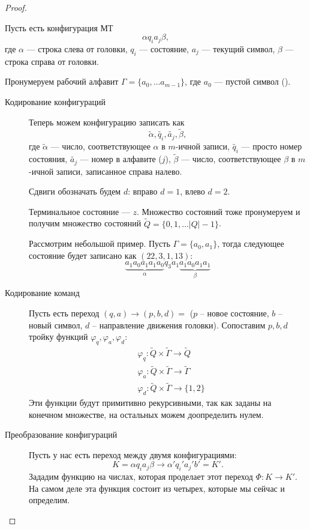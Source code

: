 \begin{proof}
\begin{description}
			Пусть есть конфигурация МТ 
			$$ \alpha q_i a_j \beta ,$$ где $ \alpha $ --- строка слева от головки, $ q_i$ --- состояние, $ a_j$ --- текущий символ, $ \beta $ --- строка справа от головки.

			Пронумеруем рабочий алфавит $ \Gamma = \{a_0, \ldots a_{m-1}\}$, где $ a_0$ --- пустой символ (\textvisiblespace).

			\begin{description}
				\item[Кодирование конфигураций]
			Теперь можем конфигурацию записать как 
			 \[
				 \widetilde{ \alpha } , \widetilde{ q_i} , \widetilde{ a_j} , \widetilde{ \beta } 
			,\] 
			где $ \widetilde{ \alpha } $ --- число, соответствующее $ \alpha $  в $  m$-ичной записи, $ \widetilde{ q_i} $ --- просто номер состояния, $ \widetilde{ a_j} $ --- номер  в алфавите ($ j$), $ \widetilde{ \beta } $ --- число, соответствующее $ \beta $ в $ m$-ичной записи, записанное справа налево. 

			Сдвиги обозначать будем $ d$: вправо  $d= 1$, влево $ d= 2$.

			Терминальное состояние --- $ z$. 
			Множество состояний тоже пронумеруем и получим множество состояний $ \widetilde{ Q}  = \{0, 1, \ldots \lvert Q \rvert - 1\}$.

			\begin{ex}
			    Рассмотрим небольшой пример. Пусть 
				$ \Gamma = \{a_0, a_1\}$, тогда следующее состояние 
				будет записано как $ (22, 3, 1, 13) $:
				\[
					\underbrace{a_1a_0a_1a_1a_0}_{ \alpha } q_3 a_1 \underbrace{a_1 a_0 a_1a_1}_{ \beta }
				\]
			\end{ex}

		\item [Кодирование команд]
			Пусть есть переход $ (q, a) \to (p, b, d) = $ ($ p$ -- новое состояние, $ b$ -- новый символ, $ d$ -- направление движения головки).
			Сопоставим $ p, b, d$ тройку функций $ \varphi _{q}, \varphi _{a}, \varphi _{d}$:
			\[
			\begin{aligned}
				& \varphi _{q} \colon \widetilde{ Q} \times \widetilde{ \Gamma }  \to  \widetilde{ Q} \\
				&\varphi _a \colon \widetilde{ Q} \times \widetilde{ \Gamma  }  \to \widetilde{ \Gamma } \\
				& \varphi _{d} \colon \widetilde{ Q} \times \widetilde{ \Gamma } \to \{1, 2\}
			\end{aligned}
			\]
			Эти функции будут примитивно рекурсивными, так как заданы на конечном множестве, на остальных можем доопределить нулем.
		\item[Преобразование конфигураций]
			Пусть у нас есть переход между двумя конфигурациями: 
			$$ K = \alpha q_i a_j \beta  \to \alpha ' q_i' a_j' b' = K'.$$
			Зададим функцию на числах, которая проделает этот переход $ \Phi \colon K \to  K'$. На самом деле эта функция состоит из четырех, которые мы сейчас и определим.


\end{description}
\end{description}
\end{proof}
